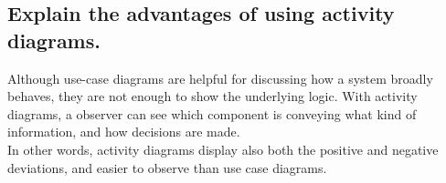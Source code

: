 			
		
		\subsection{Explain the advantages of using activity diagrams.}
		
		Although use-case diagrams are helpful for discussing how a system broadly behaves, they are not enough to show the underlying logic. With activity diagrams, a observer can see which component is conveying what kind of information, and how decisions are made.\\
		
		In other words, activity diagrams display also both the positive and negative deviations, and easier to observe than use case diagrams.